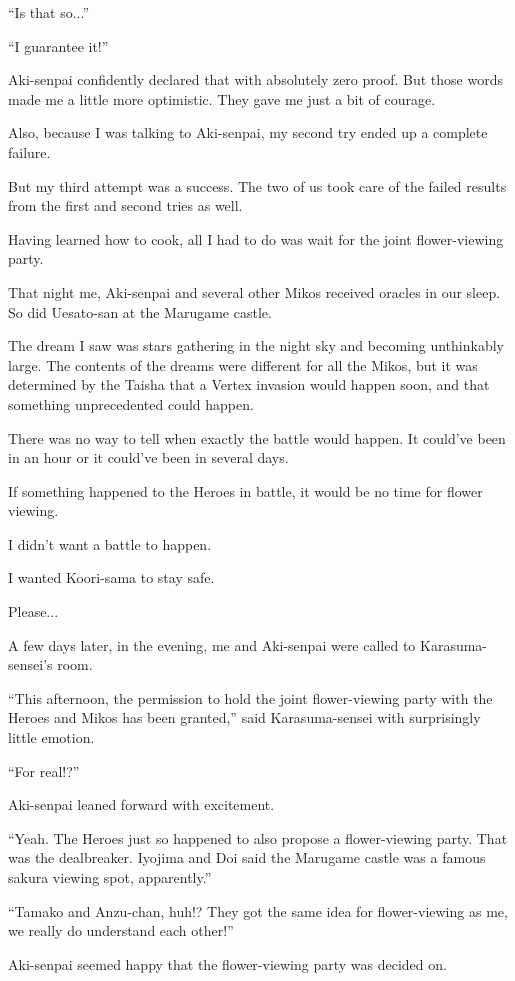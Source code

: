 ``Is that so...''

``I guarantee it!''

Aki-senpai confidently declared that with absolutely zero proof. But those words made me a little more optimistic. They gave me just a bit of courage.

Also, because I was talking to Aki-senpai, my second try ended up a complete failure.

But my third attempt was a success.  The two of us took care of the failed results from the first and second tries as well.

Having learned how to cook, all I had to do was wait for the joint flower-viewing party.

That night me, Aki-senpai and several other Mikos received oracles in our sleep. So did Uesato-san at the Marugame castle.

The dream I saw was stars gathering in the night sky and becoming unthinkably large. The contents of the dreams were different for all the Mikos, but it was determined by the Taisha that a Vertex invasion would happen soon, and that something unprecedented could happen.

There was no way to tell when exactly the battle would happen. It could've been in an hour or it could've been in several days.

If something happened to the Heroes in battle, it would be no time for flower viewing.

I didn't want a battle to happen.

I wanted Koori-sama to stay safe.

Please...

A few days later, in the evening, me and Aki-senpai were called to Karasuma-sensei's room.

``This afternoon, the permission to hold the joint flower-viewing party with the Heroes and Mikos has been granted,'' said Karasuma-sensei with surprisingly little emotion.

``For real!?''

Aki-senpai leaned forward with excitement.

``Yeah. The Heroes just so happened to also propose a flower-viewing party. That was the dealbreaker. Iyojima and Doi said the Marugame castle was a famous sakura viewing spot, apparently.''

``Tamako and Anzu-chan, huh!? They got the same idea for flower-viewing as me, we really do understand each other!''

Aki-senpai seemed happy that the flower-viewing party was decided on.

